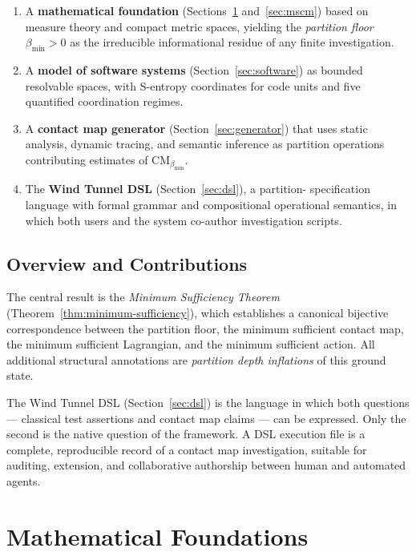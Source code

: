 \documentclass[12pt,a4paper,twocolumn]{article}
\theoremstyle{plain}
\theoremstyle{definition}
\theoremstyle{remark}
\newcommand{\CM}{\mathrm{CM}}
\newcommand{\bmin}{\beta_{\min}}
\newcommand{\CMbmin}{\CM_{\bmin}}
\begin{document}
\begin{enumerate}[label=(\roman*)]
\item A \textbf{mathematical foundation} (Sections~\ref{sec:foundations}
  and~\ref{sec:mscm}) based on measure theory and compact metric spaces,
  yielding the \emph{partition floor} $\bmin > 0$ as the irreducible
  informational residue of any finite investigation.

\item A \textbf{model of software systems} (Section~\ref{sec:software}) as
  bounded resolvable spaces, with S-entropy coordinates for code units and
  five quantified coordination regimes.

\item A \textbf{contact map generator} (Section~\ref{sec:generator}) that
  uses static analysis, dynamic tracing, and semantic inference as partition
  operations contributing estimates of $\CMbmin$.

\item The \textbf{Wind Tunnel DSL} (Section~\ref{sec:dsl}), a partition-
  specification language with formal grammar and compositional operational
  semantics, in which both users and the system co-author investigation
  scripts.
\end{enumerate}

\subsection{Overview and Contributions}

The central result is the \emph{Minimum Sufficiency Theorem}
(Theorem~\ref{thm:minimum-sufficiency}), which establishes a canonical
bijective correspondence between the partition floor, the minimum sufficient
contact map, the minimum sufficient Lagrangian, and the minimum sufficient
action.  All additional structural annotations are \emph{partition depth
inflations} of this ground state.

The Wind Tunnel DSL (Section~\ref{sec:dsl}) is the language in which both
questions --- classical test assertions and contact map claims --- can be
expressed.  Only the second is the native question of the framework.  A DSL
execution file is a complete, reproducible record of a contact map
investigation, suitable for auditing, extension, and collaborative authorship
between human and automated agents.

\section{Mathematical Foundations}
\label{sec:foundations}
\end{document}
